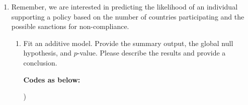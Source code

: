 \documentclass[12pt,letterpaper]{article}
\begin{document}
\begin{enumerate}
	\item
	Remember, we are interested in predicting the likelihood of an individual supporting a policy based on the number of countries participating and the possible sanctions for non-compliance.
	\begin{enumerate}
		\item [] Fit an additive model. Provide the summary output, the global null hypothesis, and $p$-value. Please describe the results and provide a conclusion.
			\vspace{.25cm}
		
		\noindent \textbf{Codes as below:}
		
 		\newpage
		
	\right) 
		

\end{enumerate}
\end{enumerate}
\end{document}
